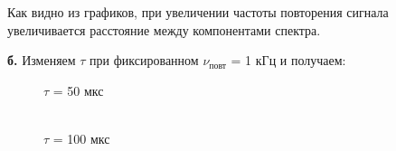 \documentclass[a4paper,12pt]{article} %
\begin{document}
\begin{enumerate}
	      Как видно из графиков, при увеличении частоты повторения сигнала увеличивается расстояние между компонентами спектра.

	      \newpage


	      \textbf{б.} Изменяем $\tau$ при фиксированном $\nu_\text{повт}$ = 1 кГц и получаем:

	      \begin{figure}[H]
		      \begin{minipage}[h]{0.47\linewidth}
			       $\tau$ = 50 мкс \\
		      \end{minipage}
		      \hfill
		      \begin{minipage}[h]{0.47\linewidth}
			       \\ $\tau$ = 100 мкс

\end{minipage}
\end{figure}
\end{enumerate}
\end{document}
